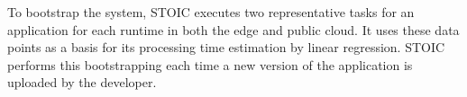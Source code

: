 To bootstrap the system, STOIC executes two representative tasks for an application for each runtime in both the edge and public cloud. It uses these data points as a basis for its processing time estimation by linear regression. STOIC performs this bootstrapping each time a new version of the application is uploaded by the developer.




